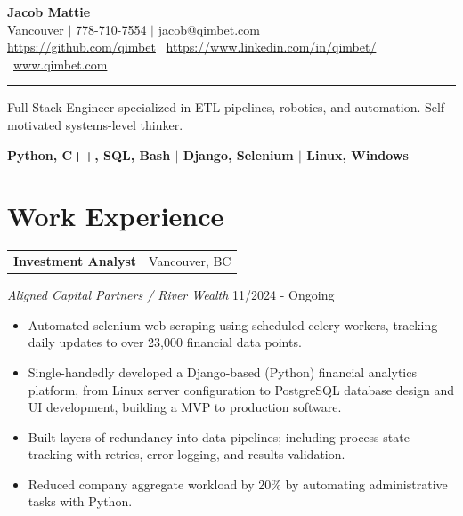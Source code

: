\documentclass[a4paper,10pt]{article}
\makeatletter
\newcommand{\work}[5]{
	{
		\vspace{1.5mm}
		\noindent
		\begin{tabular*}{\textwidth}{@{\extracolsep{\fill}} l r}
			\textbf{#1} & #2 \\
		\end{tabular*}
		\vspace{-5mm}
		\textit{#3} \hfill #4 \\
		\begin{itemize}
			\setlength{\itemsep}{-1mm}
			\setlength{\topsep}{0mm}
			\setlength{\parsep}{0mm}
			#5
		\end{itemize}
	}
}
\makeatother
\begin{document}
	\begin{center}
		{\huge \bfseries Jacob Mattie} \\[0.75em]
		Vancouver $|$ 778-710-7554 $|$ \href{mailto:jacob@qimbet.com}{jacob@qimbet.com}\\[0.25em]
		
		\href{https://github.com/qimbet}{https://github.com/qimbet} \textbar\ \href{https://www.linkedin.com/in/qimbet/}{https://www.linkedin.com/in/qimbet/} \textbar\
		\href{www.qimbet.com}{www.qimbet.com}
		
	\end{center}
	
	\vspace{-1em}	
	\noindent\rule{\textwidth}{0.4pt}
	\vspace{-0.5em}
	
	\noindent
	Full-Stack Engineer specialized in ETL pipelines, robotics, and automation. Self-motivated systems-level thinker.
	
	\vspace{0em}
	
	\begin{center}
		\textbf{
			Python, C++, SQL, Bash \quad $|$ \quad Django, Selenium \quad $|$ \quad Linux, Windows
		}
		\\
		\vspace{1em}
		
		
	\end{center}
	
	
	
\section*{Work Experience}
	
	\work
	{Investment Analyst}
	{Vancouver, BC}
	{Aligned Capital Partners / River Wealth}
	{11/2024 - Ongoing}
	{
		\item Automated selenium web scraping using scheduled celery workers, tracking daily updates to over 23,000 financial data points.
		
		\item Single-handedly developed a Django-based (Python) financial analytics platform, from Linux server configuration to PostgreSQL database design and UI development, building a MVP to production software.
		
		\item Built layers of redundancy into data pipelines; including process state-tracking with retries, error logging, and results validation.
		
		\item Reduced company aggregate workload by 20\% by automating administrative tasks with Python.
	}
	
\end{document}

